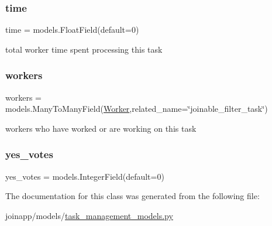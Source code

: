 \subsubsection{\texorpdfstring{time}{time}}
{\footnotesize\ttfamily time = models.\+Float\+Field(default=0)\hspace{0.3cm}{\ttfamily [static]}}



total worker time spent processing this task 

\mbox{\label{classjoinapp_1_1models_1_1task__management__models_1_1_j_f_task_a42a0cd7f4a34b940f08fd182458c9aba}} 
\subsubsection{\texorpdfstring{workers}{workers}}
{\footnotesize\ttfamily workers = models.\+Many\+To\+Many\+Field(\mbox{\hyperlink{classjoinapp_1_1models_1_1task__management__models_1_1_worker}{Worker}},related\+\_\+name=\char`\"{}joinable\+\_\+filter\+\_\+task\char`\"{})\hspace{0.3cm}{\ttfamily [static]}}



workers who have worked or are working on this task 

\mbox{\label{classjoinapp_1_1models_1_1task__management__models_1_1_j_f_task_ab50f50bde4c2c1524460c48def8f27f3}} 
\subsubsection{\texorpdfstring{yes\_votes}{yes\_votes}}
{\footnotesize\ttfamily yes\+\_\+votes = models.\+Integer\+Field(default=0)\hspace{0.3cm}{\ttfamily [static]}}



The documentation for this class was generated from the following file\+:\begin{DoxyCompactItemize}
\item 
joinapp/models/\mbox{\hyperlink{task__management__models_8py}{task\+\_\+management\+\_\+models.\+py}}\end{DoxyCompactItemize}
